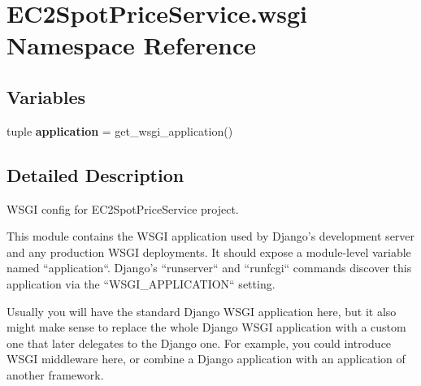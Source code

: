 \hypertarget{namespaceEC2SpotPriceService_1_1wsgi}{\section{E\-C2\-Spot\-Price\-Service.\-wsgi Namespace Reference}
\label{namespaceEC2SpotPriceService_1_1wsgi}
}
\subsection*{Variables}
\begin{DoxyCompactItemize}
\item 
\hypertarget{namespaceEC2SpotPriceService_1_1wsgi_a976b04522000581bf38c88a55d3186af}{tuple {\bfseries application} = get\-\_\-wsgi\-\_\-application()}\label{namespaceEC2SpotPriceService_1_1wsgi_a976b04522000581bf38c88a55d3186af}

\end{DoxyCompactItemize}


\subsection{Detailed Description}
\begin{DoxyVerb}WSGI config for EC2SpotPriceService project.

This module contains the WSGI application used by Django's development server
and any production WSGI deployments. It should expose a module-level variable
named ``application``. Django's ``runserver`` and ``runfcgi`` commands discover
this application via the ``WSGI_APPLICATION`` setting.

Usually you will have the standard Django WSGI application here, but it also
might make sense to replace the whole Django WSGI application with a custom one
that later delegates to the Django one. For example, you could introduce WSGI
middleware here, or combine a Django application with an application of another
framework.\end{DoxyVerb}
 